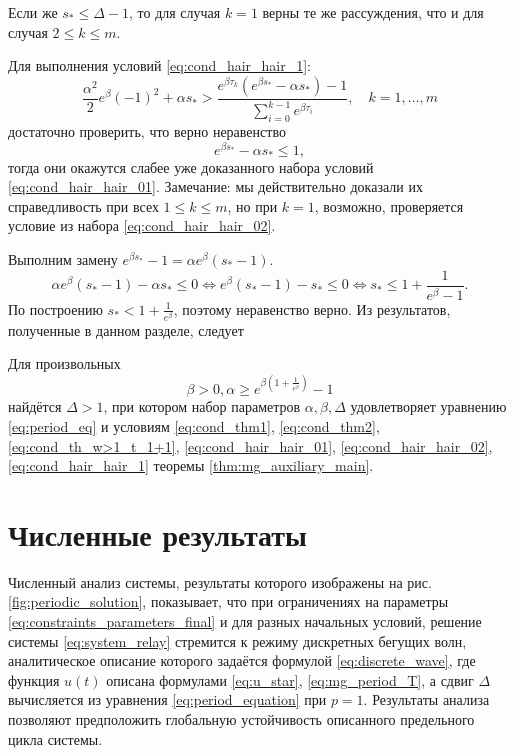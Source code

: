 Если же $s_* \leqslant \Delta - 1$, то для случая $k = 1$ верны те же рассуждения, что и для случая $2 \leqslant k \leqslant m$.

Для выполнения условий \eqref{eq:cond_hair_hair_1}:
\[
\frac{\alpha^2}{2}e^\beta(-1)^2+\alpha s_*>\frac{e^{\beta \tau_k}(e^{\beta s_*}-\alpha s_*)-1}{\sum_{i=0}^{k-1}e^{\beta \tau_i}},\quad k = 1,\ldots, m
\]
достаточно проверить, что верно неравенство
\[
e^{\beta s_*}-\alpha s_* \leqslant 1,
\]
тогда они окажутся слабее уже доказанного набора условий \eqref{eq:cond_hair_hair_01}. Замечание: мы действительно доказали их справедливость при всех $1 \leqslant k \leqslant m$, но при $k = 1$, возможно, проверяется условие из набора \eqref{eq:cond_hair_hair_02}.

Выполним замену $e^{\beta s_*} - 1 = \alpha e^\beta (s_* - 1)$.
%
\[
\alpha e^{\beta}(s_* - 1) - \alpha s_* \leqslant 0 \Leftrightarrow e^{\beta}(s_* - 1) - s_* \leqslant 0 \Leftrightarrow s_* \leqslant 1 + \frac{1}{e^{\beta} - 1}.
\]
%
По построению $s_* < 1 + \frac{1}{e^{\beta}}$, поэтому неравенство верно.
%
Из результатов, полученные в данном разделе, следует
%
\begin{theorem}
	\label{thm:relay_main}
	Для произвольных 
	\begin{equation}
		\label{eq:constraints_parameters_final}
		\beta > 0, \alpha \geq e^{\beta\left(1 + \frac{1}{e^{\beta}}\right)} - 1
	\end{equation}
	найдётся $\Delta > 1$, при котором набор параметров $\alpha, \beta, \Delta$ удовлетворяет уравнению \eqref{eq:period_eq} и условиям \eqref{eq:cond_thm1}, \eqref{eq:cond_thm2}, \eqref{eq:cond_th_w>1_t_1+1}, \eqref{eq:cond_hair_hair_01}, \eqref{eq:cond_hair_hair_02}, \eqref{eq:cond_hair_hair_1} теоремы \ref{thm:mg_auxiliary_main}.
\end{theorem}


\section{Численные результаты}\label{sec:ch2/sect4}
%
Численный анализ системы, результаты которого изображены на рис. \ref{fig:periodic_solution}, показывает, что при ограничениях на параметры \eqref{eq:constraints_parameters_final} и для разных начальных условий, решение системы \eqref{eq:system_relay} стремится к режиму дискретных бегущих волн, аналитическое описание которого задаётся формулой \eqref{eq:discrete_wave}, где функция $u(t)$ описана формулами \eqref{eq:u_star}, \eqref{eq:mg_period_T}, а сдвиг $\Delta$ вычисляется из уравнения \eqref{eq:period_equation} при $p = 1$. Результаты анализа позволяют предположить глобальную устойчивость описанного предельного цикла системы.


